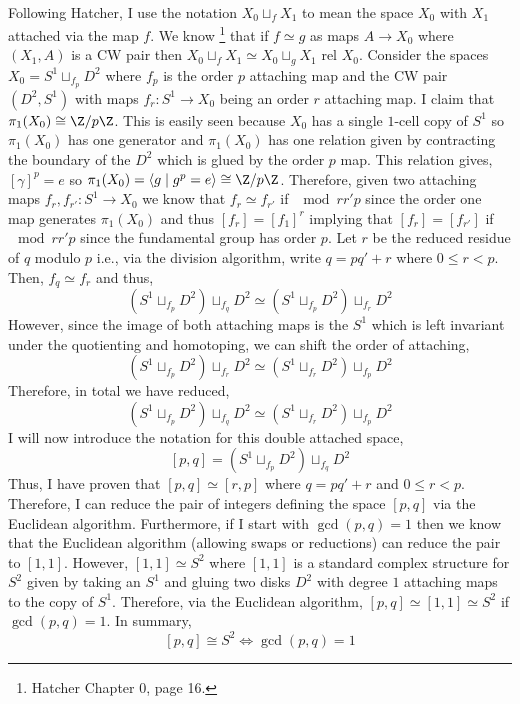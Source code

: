 \documentclass[12pt]{extarticle}
\begin{document}
\bigskip\\
Following Hatcher, I use the notation $X_0 \sqcup_{f} X_1$ to mean the space $X_0$ with $X_1$ attached via the map $f$. We know \footnote{Hatcher Chapter 0, page 16.} that if $f \simeq g$ as maps $A \to X_0$ where $(X_1, A)$ is a CW pair then $X_0 \sqcup_f X_1 \simeq X_0 \sqcup_g X_1$ rel $X_0$. Consider the spaces $X_0 = S^1 \sqcup_{f_p} D^2$ where $f_p$ is the order $p$ attaching map and the CW pair $(D^2, S^1)$ with maps $f_r : S^1 \to X_0$ being an order $r$ attaching map. I claim that $\pi_1(X_0) \cong \Z / p \Z$. This is easily seen because $X_0$ has a single $1$-cell copy of $S^1$ so $\pi_1(X_0)$ has one generator and $\pi_1(X_0)$ has one relation given by contracting the boundary of the $D^2$ which is glued by the order $p$ map. This relation gives, $[\gamma]^p = e$ so $\pi_1(X_0) = \left< g \mid g^p = e \right> \cong \Z / p \Z$.  Therefore, given two attaching maps $f_{r}, f_{r'} : S^1 \to X_0$ we know that $f_{r} \simeq f_{r'}$ if $\mod{r}{r'}{p}$ since the order one map generates $\pi_1(X_0)$ and thus $[f_r] = [f_1]^r$ implying that $[f_r] = [f_{r'}]$ if $\mod{r}{r'}{p}$ since the fundamental group has order $p$. Let $r$ be the reduced residue of $q$ modulo $p$ i.e., via the division algorithm, write $q = pq' + r$ where $0 \le r < p$. Then, $f_{q} \simeq f_{r}$ and thus,
\[ (S^1 \sqcup_{f_p} D^2) \sqcup_{f_{q}} D^2 \simeq (S^1 \sqcup_{f_p} D^2) \sqcup_{f_{r}} D^2 \] 
However, since the image of both attaching maps is the $S^1$ which is left invariant under the quotienting and homotoping, we can shift the order of attaching,
\[ (S^1 \sqcup_{f_p} D^2) \sqcup_{f_{r}} D^2  \simeq (S^1 \sqcup_{f_r} D^2) \sqcup_{f_{p}} D^2 \]
Therefore, in total we have reduced,
\[ (S^1 \sqcup_{f_p} D^2) \sqcup_{f_{q}} D^2 \simeq (S^1 \sqcup_{f_r} D^2) \sqcup_{f_{p}} D^2  \] 
I will now introduce the notation for this double attached space,
\[ [p, q] = (S^1 \sqcup_{f_p} D^2) \sqcup_{f_{q}} D^2 \]
Thus, I have proven that $[p, q] \simeq [r, p]$ where $q = pq' + r$ and $0 \le r < p$. Therefore, I can reduce the pair of integers defining the space $[p,q]$ via the Euclidean algorithm. Furthermore, if I start with $\gcd{(p,q)} = 1$ then we know that the Euclidean algorithm (allowing swaps or reductions) can reduce the pair to $[1, 1]$.  However, $[1, 1] \simeq S^2$ where $[1,1]$ is a standard complex structure for $S^2$ given by taking an $S^1$ and gluing two disks $D^2$ with degree $1$ attaching maps to the copy of $S^1$. Therefore, via the Euclidean algorithm, $[p, q] \simeq [1, 1] \simeq S^2$ if $\gcd{(p,q)} = 1$. In summary, 
\[ [p,q] \cong S^2 \iff \gcd{(p,q)} = 1 \]
\end{document}
